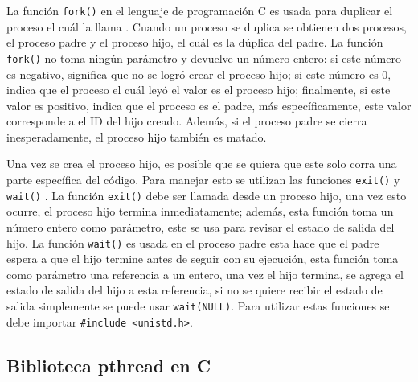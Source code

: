 \documentclass{report}
\begin{document}
La función \texttt{fork()} en el lenguaje de programación C es usada para duplicar el proceso el cuál la llama \cite{ref5}.
Cuando un proceso se duplica se obtienen dos procesos, el proceso padre y el proceso hijo, el cuál es la dúplica del padre.
La función \texttt{fork()} no toma ningún parámetro y devuelve un número entero: si este número es negativo, significa que no se logró crear el proceso hijo; si este número es 0, indica que el proceso el cuál leyó el valor es el proceso hijo; finalmente, si este valor es positivo, indica que el proceso es el padre, más específicamente, este valor corresponde a el ID del hijo creado. 
Además, si el proceso padre se cierra inesperadamente, el proceso hijo también es matado.

Una vez se crea el proceso hijo, es posible que se quiera que este solo corra una parte específica del código.
Para manejar esto se utilizan las funciones \texttt{exit()} y \texttt{wait()} \cite{ref5}.
La función \texttt{exit()} debe ser llamada desde un proceso hijo, una vez esto ocurre, el proceso hijo termina inmediatamente; además, esta función toma un número entero como parámetro, este se usa para revisar el estado de salida del hijo.
La función \texttt{wait()} es usada en el proceso padre esta hace que el padre espera a que el hijo termine antes de seguir con su ejecución, esta función toma como parámetro una referencia a un entero, una vez el hijo termina, se agrega el estado de salida del hijo a esta referencia, si no se quiere recibir el estado de salida simplemente se puede usar \texttt{wait(NULL)}. Para utilizar estas funciones se debe importar \texttt{\#include <unistd.h>}.

\subsection {Biblioteca pthread en C}
\end{document}
